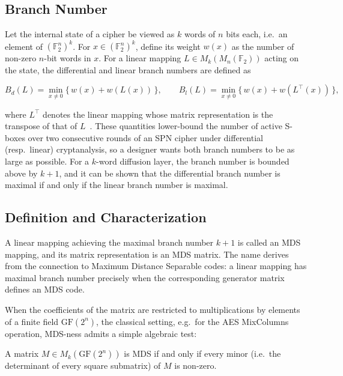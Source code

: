 \subsection{Branch Number}

Let the internal state of a cipher be viewed as $k$ words of $n$ bits each, i.e.\
an element of $(\mathbb{F}_2^n)^k$. For $x \in (\mathbb{F}_2^n)^k$, define its
weight $w(x)$ as the number of non-zero $n$-bit words in $x$. For a linear
mapping $L \in M_k(M_n(\mathbb{F}_2))$ acting on the state, the differential
and linear branch numbers are defined as

\begin{equation}
B_d(L) = \min_{x \neq 0} \{\, w(x) + w(L(x)) \,\}, \qquad
B_l(L) = \min_{x \neq 0} \{\, w(x) + w(L^{\top}(x)) \,\},
\end{equation}

where $L^{\top}$ denotes the linear mapping whose matrix representation is the
transpose of that of $L$~\cite{daemen2001wide}. These quantities lower-bound the number of
active S-boxes over two consecutive rounds of an SPN cipher under differential
(resp.\ linear) cryptanalysis, so a designer wants both branch numbers to be as
large as possible. For a $k$-word diffusion layer, the branch number is bounded
above by $k+1$, and it can be shown that the differential branch number is
maximal if and only if the linear branch number is maximal.

\subsection{Definition and Characterization}

A linear mapping achieving the maximal branch number $k+1$ is called an
MDS mapping, and its matrix representation is an MDS matrix. The
name derives from the connection to Maximum Distance Separable codes: a linear
mapping has maximal branch number precisely when the corresponding generator
matrix defines an MDS code.

When the coefficients of the matrix are restricted to multiplications by
elements of a finite field $\mathrm{GF}(2^n)$, the classical setting, e.g.\ for
the AES MixColumns operation, MDS-ness admits a simple algebraic test:

\begin{proposition}
A matrix $M \in M_k(\mathrm{GF}(2^n))$ is MDS if and only if every minor
(i.e.\ the determinant of every square submatrix) of $M$ is non-zero.
\end{proposition}

